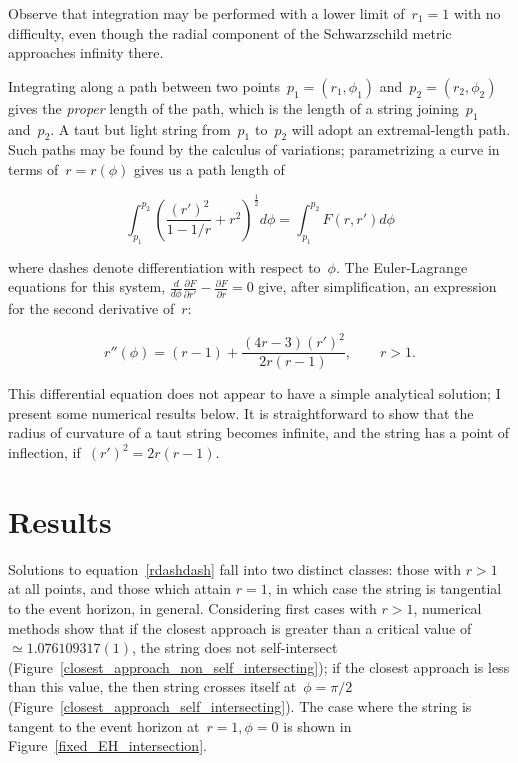 \documentclass[times,twocolumn,final]{elsarticle}
\begin{document}
Observe that integration may be performed with a lower limit
of~$r_1=1$ with no difficulty, even though the radial component of the
Schwarzschild metric approaches infinity there.  

Integrating along a path between two
points~$p_1=\left(r_1,\phi_1\right)$ and~$p_2=\left(r_2,\phi_2\right)$
gives the {\em proper} length of the path, which is the length of a
string joining~$p_1$ and~$p_2$.  A taut but light string from~$p_1$
to~$p_2$ will adopt an extremal-length path.  Such paths may be found
by the calculus of variations; parametrizing a curve in terms
of~$r=r\left(\phi\right)$ gives us a path length of

\begin{equation}
  \int_{p_1}^{p_2}\left(\frac{\left(r'\right)^2}{1-1/r} + r^2\right)^\frac{1}{2}d\phi=
  \int_{p_1}^{p_2}F\left(r,r'\right)d\phi
\end{equation}

\noindent where dashes denote differentiation with respect to~$\phi$.  The
Euler-Lagrange equations for this system,
$\frac{d}{d\phi}\frac{\partial F}{\partial r'}-\frac{\partial
  F}{\partial r}=0$ give, after simplification, an expression for the
second derivative of~$r$:

\begin{equation}\label{rdashdash}
  r''\left(\phi\right) =
  (r-1) + \frac{(4r-3)\left(r'\right)^2}{2r\left(r-1\right)},\qquad r>1.
\end{equation}

This differential equation does not appear to have a simple analytical
solution; I present some numerical results below.  It is
straightforward to show that the radius of curvature of a taut string
becomes infinite, and the string has a point of inflection,
if~$\left(r'\right)^2=2r\left(r-1\right)$.

\section{Results}
Solutions to equation~\ref{rdashdash} fall into two distinct classes:
those with $r>1$ at all points, and those which attain $r=1$, in which
case the string is tangential to the event horizon, in general.
Considering first cases with $r>1$, numerical methods show that if the
closest approach is greater than a critical value of~$\simeq
1.076109317(1)$, the string does not self-intersect
(Figure~\ref{closest_approach_non_self_intersecting}); if the closest
approach is less than this value, the then string crosses itself
at~$\phi=\pi/2$ (Figure~\ref{closest_approach_self_intersecting}).
The case where the string is tangent to the event horizon
at~$r=1,\phi=0$ is shown in Figure~\ref{fixed_EH_intersection}.
\end{document}
